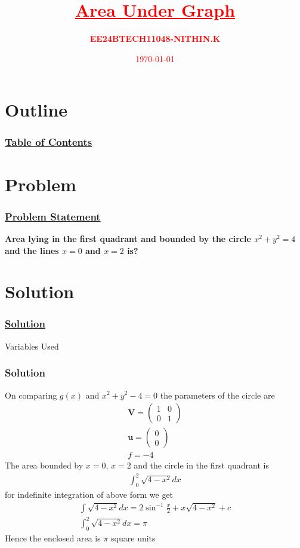 \documentclass{beamer}
\title{\textcolor{red}{\underline{\textbf{Area Under Graph}}}}
\author{\textcolor{red}{\textbf{EE24BTECH11048-NITHIN.K}}}
\date{\textcolor{red}{\today}}
\providecommand{\brak}[1]{\ensuremath{\left(#1\right)}}
\theoremstyle{remark}
\newcommand{\myvec}[1]{\ensuremath{\begin{pmatrix}#1\end{pmatrix}}}
\let\vec\mathbf
\numberwithin{equation}{section}
\begin{document}
\begin{frame}
	\titlepage
\end{frame}

\section{Outline}
\begin{frame}
	\frametitle{\underline{\textbf{Table of Contents}}}
	\tableofcontents
\end{frame}

\section{Problem}
\begin{frame}
	\frametitle{\underline{Problem Statement}}
	\textbf{Area lying in the first quadrant and bounded by the circle $x^2 + y^2 = 4$ and the lines $x = 0$ and $x = 2$ is?}
\end{frame}

\section{Solution}
\begin{frame}
	\frametitle{\underline{Solution}}
		\begin{table}[H]
			\centering
			\resizebox{\textwidth}{!}{
				
			}
			\caption{Variables Used}
		\end{table}
\end{frame}

\begin{frame}
	\frametitle{Solution}
	\small
	On comparing $g\brak{x}$ and $x^2 + y^2 - 4 = 0$ the parameters of the circle are
	\begin{align}
		\vec{V} = \myvec{ 1 & 0 \\
		0 & 1 } \\
		\vec{u} = \myvec{0 \\
		0 } \\
		f = -4
	\end{align}
	The area bounded by $x=0$, $x=2$ and the circle in the first quadrant is
	\begin{align}
		\int_{0}^{2}\sqrt{4 - x^2} dx
	\end{align}
	for indefinite integration of above form we get
	\begin{align}
		\int\sqrt{4 - x^2} dx = 2\sin^{-1}\frac{x}{2} + x\sqrt{4 - x^2} + c \\
		\int_{0}^{2}\sqrt{4 - x^2} dx = \pi
	\end{align}
	Hence the enclosed area is $\pi$ square units
\end{frame}
\end{document}
